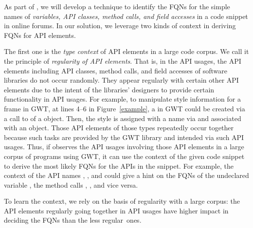 
As part of {\tool}, we will develop a technique to identify the FQNs for
the simple names of {\em variables, API classes, method calls, and
  field accesses} in a code snippet in online forums.
%
In our solution, we leverage two kinds of context in deriving FQNs for
API elements. 

The first one is the {\em type context} of API elements in a
large code corpus. We call it the principle of {\em regularity of API
  elements}.
That is, in the API usages, the API elements including API classes,
method calls, and field accesses of software libraries do not occur
randomly. They appear regularly with certain other API elements due to
the intent of the libraries' designers to provide certain
functionality in API usages. For example, to manipulate style
information for a frame in GWT, at lines 4--6 in Figure~\ref{example},
a  in GWT could be created via a call to
 of a  object. Then, the style
is assigned with a name via  and
associated with an  object. Those API elements of
those types repeatedly occur together because such tasks are provided
by the GWT library and intended via such API usages. Thus, if {\tool}
observes the API usages involving those API elements in a large corpus
of programs using GWT, it can use the context of the given code
snippet to derive the most likely FQNs for the APIs in the
snippet. For example, the context of the API names
, , and 
could give {\tool} a hint on the FQNs of the undeclared variable
, the method calls ,
, and vice versa.

To learn the context, we rely on the basis of regularity with a large
corpus: the API elements regularly going together in API
usages have higher impact in deciding the FQNs than the less
regular~ones.



